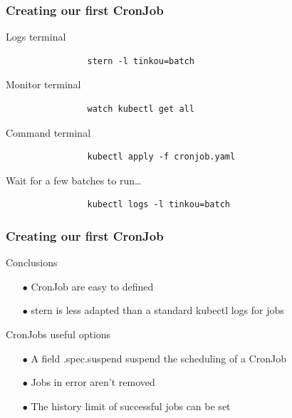 	\begin{frame}[fragile]
		\frametitle{Creating our first CronJob}
		
		\begin{block}{Logs terminal}
			\begin{verbatim}
				stern -l tinkou=batch
			\end{verbatim}
		\end{block}
		
		\begin{block}{Monitor terminal}
			\begin{verbatim}
				watch kubectl get all
			\end{verbatim}
		\end{block}
		
		\begin{block}{Command terminal}
			\begin{verbatim}
				kubectl apply -f cronjob.yaml
			\end{verbatim}
			Wait for a few batches to run…
			\begin{verbatim}
				kubectl logs -l tinkou=batch
			\end{verbatim}
		\end{block}
	\end{frame}

	\begin{frame}
		\frametitle{Creating our first CronJob}
		
		\begin{block}{Conclusions}
			\begin{itemize}
				\item[$\bullet$] CronJob are easy to defined
				\item[$\bullet$] stern is less adapted than a standard kubectl logs for jobs
			\end{itemize}
		\end{block}
		
		\begin{block}{CronJobs useful options}
			\begin{itemize}
				\item[$\bullet$] A field .spec.suspend suspend the scheduling of a CronJob
				\item[$\bullet$] Jobs in error aren't removed
				\item[$\bullet$] The history limit of successful jobs can be set
			\end{itemize}
		
		\end{block}
	\end{frame}
	
